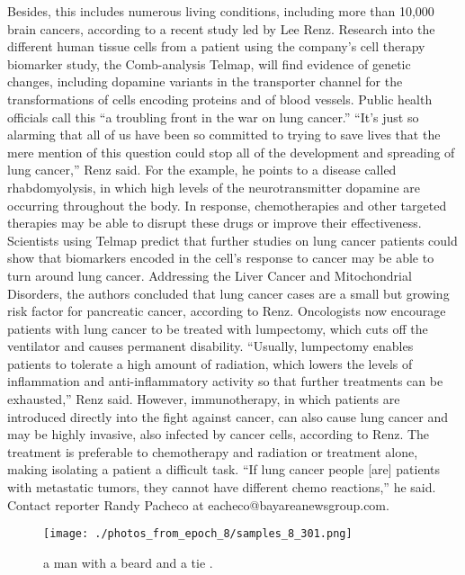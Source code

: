 \documentclass{article}%
\begin{document}
Besides, this includes numerous living conditions, including more than 10,000 brain cancers, according to a recent study led by Lee Renz.\newline%
Research into the different human tissue cells from a patient using the company’s cell therapy biomarker study, the Comb{-}analysis Telmap, will find evidence of genetic changes, including dopamine variants in the transporter channel for the transformations of cells encoding proteins and of blood vessels.\newline%
Public health officials call this “a troubling front in the war on lung cancer.”\newline%
“It’s just so alarming that all of us have been so committed to trying to save lives that the mere mention of this question could stop all of the development and spreading of lung cancer,” Renz said.\newline%
For the example, he points to a disease called rhabdomyolysis, in which high levels of the neurotransmitter dopamine are occurring throughout the body.\newline%
In response, chemotherapies and other targeted therapies may be able to disrupt these drugs or improve their effectiveness.\newline%
Scientists using Telmap predict that further studies on lung cancer patients could show that biomarkers encoded in the cell’s response to cancer may be able to turn around lung cancer.\newline%
Addressing the Liver Cancer and Mitochondrial Disorders, the authors concluded that lung cancer cases are a small but growing risk factor for pancreatic cancer, according to Renz.\newline%
Oncologists now encourage patients with lung cancer to be treated with lumpectomy, which cuts off the ventilator and causes permanent disability.\newline%
“Usually, lumpectomy enables patients to tolerate a high amount of radiation, which lowers the levels of inflammation and anti{-}inflammatory activity so that further treatments can be exhausted,” Renz said.\newline%
However, immunotherapy, in which patients are introduced directly into the fight against cancer, can also cause lung cancer and may be highly invasive, also infected by cancer cells, according to Renz. The treatment is preferable to chemotherapy and radiation or treatment alone, making isolating a patient a difficult task.\newline%
“If lung cancer people {[}are{]} patients with metastatic tumors, they cannot have different chemo reactions,” he said.\newline%
Contact reporter Randy Pacheco at eacheco@bayareanewsgroup.com.\newline%

%


\begin{figure}[h!]%
\centering%
\texttt{[image: ./photos\_from\_epoch\_8/samples\_8\_301.png]}%
\caption{a man with a beard and a tie .}%
\end{figure}

%
\end{document}
